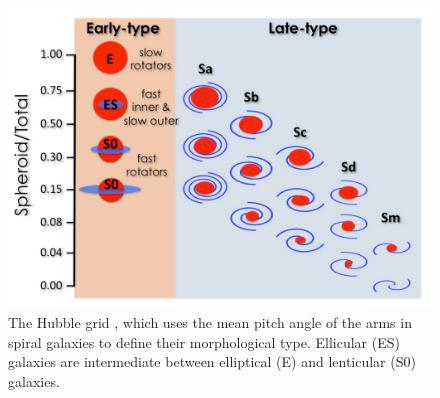 \documentclass[useAMS,usenatbib,article]{mnras}
\begin{document}
\begin{figure}[h]
\begin{center}
\includegraphics[width=\columnwidth]{Hubblegrid.pdf}
\caption{The Hubble grid \citep{graham2014review}, 
which uses the mean pitch angle of the arms in spiral galaxies to define their morphological type. 
Ellicular (ES) galaxies are intermediate between elliptical (E) and lenticular (S0) galaxies. }
\label{fig:grid}
\end{center}
\end{figure}
\end{document}
